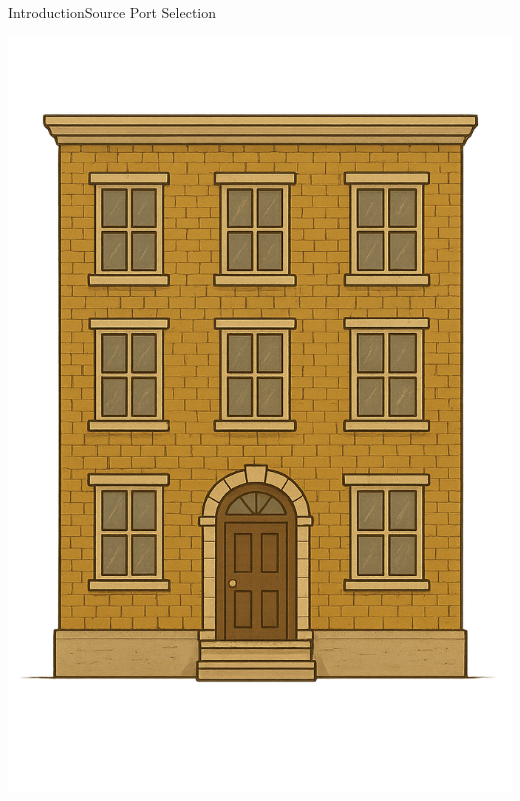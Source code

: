 \documentclass[aspectratio=169, hyperref={colorlinks=true, allcolors=SecondaryColor}, c]{beamer}
\begin{document}
\begin{frame}[fragile]{Introduction}{Source Port Selection}
\begin{itemize}
\begin{transformation}[0.2][0.6][0.2]
				\includegraphics[width=\textwidth]{./figures/apartment2.png}
			\end{transformation}
		\end{itemize}
	\end{frame}
\end{document}
